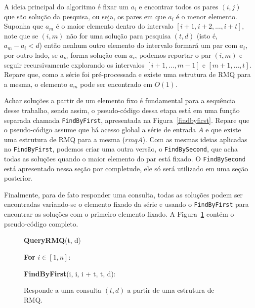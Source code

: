 \documentclass[12pt]{article}
\begin{document}
A ideia principal do algoritmo é fixar um $a_i$ e encontrar todos os pares $(i, j)$ 
que são solução da pesquisa, ou seja, os pares em que $a_i$ é o menor elemento. 
Suponha que $a_m$ é o maior elemento dentro do intervalo $[i+1, i+2, \ldots, i+t]$, 
note que se $(i, m)$ não for uma solução para pesquisa $(t, d)$ (isto é, $a_m - a_i < d$) então
nenhum outro elemento do intervalo formará um par com $a_i$, por outro lado, se $a_m$  
forma solução com $a_i$, podemos reportar o par $(i, m)$ e seguir recursivamente explorando os intervalos
$[i+1, \ldots, m - 1]$ e $[m + 1, \ldots, t]$. Repare que, como a série foi
pré-processada e existe uma estrutura de RMQ para a mesma, o elemento $a_m$
pode ser encontrado em $O(1)$.

Achar soluções a partir de um elemento fixo é fundamental para a sequência
desse trabalho, sendo assim, o pseudo-código dessa etapa está em uma função separada chamada \verb|FindByFirst|,
apresentada na Figura~\ref{findbyfirst}. Repare que o pseudo-código assume que há acesso global a série
de entrada $A$ e que existe uma estrutura de RMQ para a mesma ($rmqA$). Com as mesmas
ideias aplicadas no \verb|FindByFirst|, podemos criar uma outra versão, o \verb|FindBySecond|, que
acha todas as soluções quando o maior elemento do par está fixado. O \verb|FindBySecond| está apresentado
nessa seção por completude, ele só será utilizado em uma seção posterior.

Finalmente, para de fato responder uma consulta, todas as soluções podem ser encontradas variando-se o 
elemento fixado da série e usando o \verb|FindByFirst| para encontrar as soluções com
o primeiro elemento fixado. A Figura~\ref{queryrmq} contém  o pseudo-código completo.

\clearpage
\bigskip
\begin{figure}
\begin{framed}
{\bf QueryRMQ}(t, d)

\hspace{1cm} {\bf For} $i \in [1, n]$:

\hspace{2cm} {\bf FindByFirst}(i, i, i + t, t, d):
\caption{Responde a uma consulta $(t,d)$ a partir de uma estrutura de RMQ.}
\label{queryrmq}
\end{framed}
\end{figure}
\end{document}
